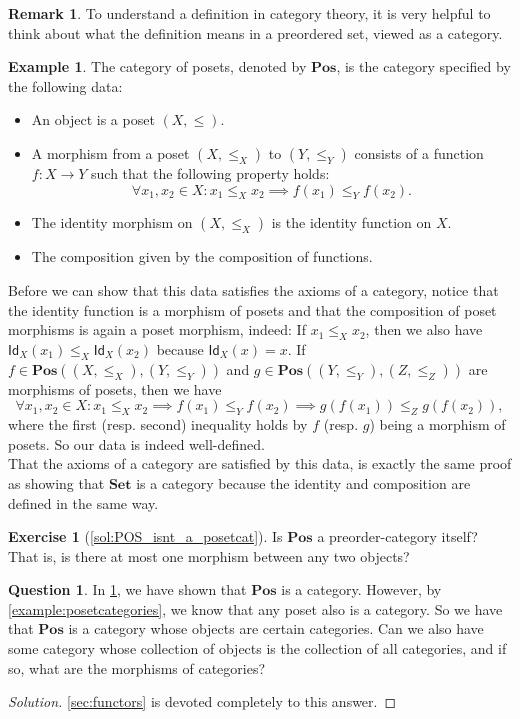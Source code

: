 \documentclass[a4paper,11pt, oneside,titlepage=false]{scrbook}
\theoremstyle{plain}
\theoremstyle{definition}
\newtheorem{rem}[thm]{Remark}
\newtheorem{que}[thm]{Question}
\newtheorem{exa}[thm]{Example}
\newtheorem{exer}[thm]{Exercise}
\newcommand{\cfont}[1]{\ensuremath{\mathsf{#1}}}
\newcommand{\Catb}[1]{\mathbf{#1}}
\newcommand{\SET}{\Catb{Set}}
\newcommand{\POS}{\Catb{Pos}}
\newcommand{\CHom}[3]{{#1}(#2,#3)}
\newcommand{\Id}[1][]{\cfont{Id}_{#1}}
\begin{document}
\begin{rem}
  To understand a definition in category theory, it is very helpful to think about what the definition means in a preordered set, viewed as a category. 
\end{rem}

\begin{exa}\label{example:poset} The category of posets, denoted by $\POS$, is the category specified by the following data:
\begin{itemize}
\item An object is a poset $(X,\leq)$.
\item A morphism from a poset $(X,\leq_X)$ to $(Y,\leq_Y)$ consists of a function $f:X\to Y$ such that the following property holds:
\[
\forall x_1, x_2 \in X: x_1\leq_X x_2 \implies f(x_1)\leq_Y f(x_2).
\]
\item The identity morphism on $(X,\leq_X)$ is the identity function on $X$.
\item The composition given by the composition of functions.
\end{itemize}

Before we can show that this data satisfies the axioms of a category, notice that the identity function is a morphism of posets and that the composition of poset morphisms is again a poset morphism, indeed: If $x_1\leq_X x_2$, then we also have $\Id[X](x_1) \leq_X \Id[X](x_2)$ because $\Id[X](x) = x$. If $f\in\CHom{\POS}{(X,\leq_X)}{(Y,\leq_Y)}$ and $g\in\CHom{\POS}{(Y,\leq_Y)} {(Z,\leq_Z)}$ are morphisms of posets, then we have 
\[
\forall x_1,x_2\in X: x_1\leq_X x_2 \implies f(x_1)\leq_Y f(x_2) \implies g(f(x_1))\leq_Z g(f(x_2)),
\]
where the first (resp. second) inequality holds by $f$ (resp. $g$) being a morphism of posets. So our data is indeed well-defined.\\
That the axioms of a category are satisfied by this data, is exactly the same proof as showing that $\SET$ is a category because the identity and composition are defined in the same way.
\end{exa}

\begin{exer}[\cref{sol:POS_isnt_a_posetcat}]\label{exer:POS_isnt_a_posetcat}
  Is $\POS$ a preorder-category itself? That is, is there at most one morphism between any two objects?
\end{exer}

\begin{que}\label{que:posetcatstoallcats} In \cref{example:poset}, we have shown that $\POS$ is a category. However, by \cref{example:posetcategories}, we know that any poset also is a category. So we have that $\POS$ is a category whose objects are certain categories. Can we also have some category whose collection of objects is the collection of all categories, and if so, what are the morphisms of categories? 
\begin{proof}[Solution]
\cref{sec:functors} is devoted completely to this answer.
\end{proof}
\end{que}
\end{document}
